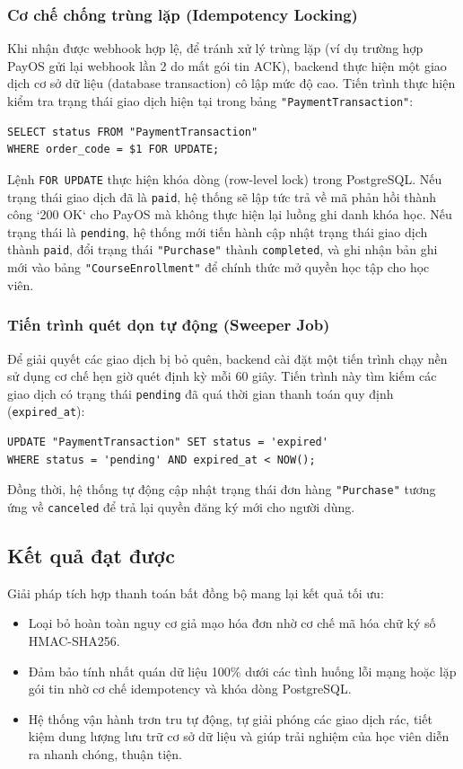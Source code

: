 \documentclass[../DoAn.tex]{subfiles}
\begin{document}
\subsubsection{Cơ chế chống trùng lặp (Idempotency Locking)}
Khi nhận được webhook hợp lệ, để tránh xử lý trùng lặp (ví dụ trường hợp PayOS gửi lại webhook lần 2 do mất gói tin ACK), backend thực hiện một giao dịch cơ sở dữ liệu (database transaction) cô lập mức độ cao. Tiến trình thực hiện kiểm tra trạng thái giao dịch hiện tại trong bảng \texttt{"PaymentTransaction"}:
\begin{verbatim}
SELECT status FROM "PaymentTransaction" 
WHERE order_code = $1 FOR UPDATE;
\end{verbatim}
Lệnh \texttt{FOR UPDATE} thực hiện khóa dòng (row-level lock) trong PostgreSQL. Nếu trạng thái giao dịch đã là \texttt{paid}, hệ thống sẽ lập tức trả về mã phản hồi thành công `200 OK` cho PayOS mà không thực hiện lại luồng ghi danh khóa học. Nếu trạng thái là \texttt{pending}, hệ thống mới tiến hành cập nhật trạng thái giao dịch thành \texttt{paid}, đổi trạng thái \texttt{"Purchase"} thành \texttt{completed}, và ghi nhận bản ghi mới vào bảng \texttt{"CourseEnrollment"} để chính thức mở quyền học tập cho học viên.

\subsubsection{Tiến trình quét dọn tự động (Sweeper Job)}
Để giải quyết các giao dịch bị bỏ quên, backend cài đặt một tiến trình chạy nền sử dụng cơ chế hẹn giờ quét định kỳ mỗi 60 giây. Tiến trình này tìm kiếm các giao dịch có trạng thái \texttt{pending} đã quá thời gian thanh toán quy định (\texttt{expired\_at}):
\begin{verbatim}
UPDATE "PaymentTransaction" SET status = 'expired'
WHERE status = 'pending' AND expired_at < NOW();
\end{verbatim}
Đồng thời, hệ thống tự động cập nhật trạng thái đơn hàng \texttt{"Purchase"} tương ứng về \texttt{canceled} để trả lại quyền đăng ký mới cho người dùng.

\subsection{Kết quả đạt được}
Giải pháp tích hợp thanh toán bất đồng bộ mang lại kết quả tối ưu:
\begin{itemize}
    \item Loại bỏ hoàn toàn nguy cơ giả mạo hóa đơn nhờ cơ chế mã hóa chữ ký số HMAC-SHA256.
    \item Đảm bảo tính nhất quán dữ liệu 100\% dưới các tình huống lỗi mạng hoặc lặp gói tin nhờ cơ chế idempotency và khóa dòng PostgreSQL.
    \item Hệ thống vận hành trơn tru tự động, tự giải phóng các giao dịch rác, tiết kiệm dung lượng lưu trữ cơ sở dữ liệu và giúp trải nghiệm của học viên diễn ra nhanh chóng, thuận tiện.
\end{itemize}
\end{document}
